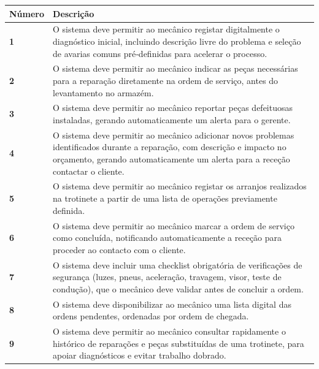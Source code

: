 \documentclass[11pt,a4paper]{article}
\begin{document}
		\begin{tabularx}{\textwidth}{@{}|l|X|@{}}
			\hline
			\rowcolor{gray!10} \textbf{Número} & \textbf{Descrição} \\ \hline
			\textbf{1} & O sistema deve permitir ao mecânico registar digitalmente o diagnóstico inicial, incluindo descrição livre do problema e seleção de avarias comuns pré‑definidas para acelerar o processo. \\ \hline
			\textbf{2} & O sistema deve permitir ao mecânico indicar as peças necessárias para a reparação diretamente na ordem de serviço, antes do levantamento no armazém. \\ \hline	
			\textbf{3} & O sistema deve permitir ao mecânico reportar peças defeituosas instaladas, gerando automaticamente um alerta para o gerente. \\ \hline
			\textbf{4} & O sistema deve permitir ao mecânico adicionar novos problemas identificados durante a reparação, com descrição e impacto no orçamento, gerando automaticamente um alerta para a receção contactar o cliente. \\ \hline
			\textbf{5} & O sistema deve permitir ao mecânico registar os arranjos realizados na trotinete a partir de uma lista de operações previamente definida. \\ \hline
			\textbf{6} & O sistema deve permitir ao mecânico marcar a ordem de serviço como concluída, notificando automaticamente a receção para proceder ao contacto com o cliente. \\ \hline
			\textbf{7} & O sistema deve incluir uma checklist obrigatória de verificações de segurança (luzes, pneus, aceleração, travagem, visor, teste de condução), que o mecânico deve validar antes de concluir a ordem. \\ \hline
			\textbf{8} & O sistema deve disponibilizar ao mecânico uma lista digital das ordens pendentes, ordenadas por ordem de chegada. \\ \hline
			\textbf{9} & O sistema deve permitir ao mecânico consultar rapidamente o histórico de reparações e peças substituídas de uma trotinete, para apoiar diagnósticos e evitar trabalho dobrado. \\ \hline
		\end{tabularx}
\end{document}
